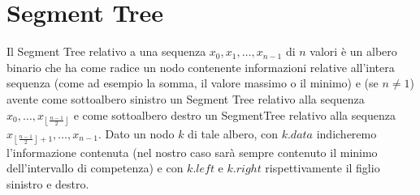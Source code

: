 \documentclass{article}
\begin{document}
\section{Segment Tree}
Il Segment Tree relativo a una sequenza $x_0,x_1,\dots,x_{n-1}$ di $n$ valori è un albero binario che ha come radice un nodo contenente informazioni relative all'intera sequenza (come ad esempio la somma, il valore massimo o il minimo) e (se $n\neq 1$) avente come sottoalbero sinistro un Segment Tree relativo alla sequenza $x_0,\dots,x_{\left\lfloor{\frac{n-1}{2}}\right\rfloor}$ e come sottoalbero destro un SegmentTree relativo alla sequenza $x_{\left\lfloor{\frac{n-1}{2}}\right\rfloor+1},\dots,x_{n-1}$. Dato un nodo $k$ di tale albero, con $k.data$ indicheremo l'informazione contenuta (nel nostro caso sarà sempre contenuto il minimo dell'intervallo di competenza) e con $k.left$ e $k.right$ rispettivamente il figlio sinistro e destro.
    \begin{center}
        \captionsetup{type=figure, width=.76\linewidth}
    \end{center}
\end{document}
